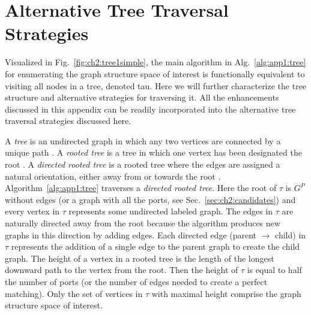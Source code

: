 \section{Alternative Tree Traversal Strategies\label{sec:app1:tree}}

Visualized in Fig.~\ref{fig:ch2:tree1simple}, the main algorithm in Alg.~\ref{alg:app1:tree} for enumerating the graph structure space of interest is functionally equivalent to visiting all nodes in a tree, denoted \gls{tau}.
Here we will further characterize the tree structure and alternative strategies for traversing it.
All the enhancements discussed in this appendix can be readily  incorporated into the alternative tree traversal strategies discussed here.

A \textit{tree} is an undirected graph in which any two vertices are connected by a unique path \cite[p.~27]{Lawler1976a}.
A \textit{rooted tree} is a tree in which one vertex has been designated the root \cite[p.~13]{Diestel2000a}.
A \textit{directed rooted tree} is a rooted tree where the edges are assigned a natural orientation, either away from or towards the root \cite[p.~29]{Lawler1976a}.
Algorithm~\ref{alg:app1:tree} traverses a \textit{directed rooted tree}.
Here the root of $\tau$ is $G^P$ without edges (or a graph with all the ports, see Sec.~\ref{sec:ch2:candidates}) and every vertex in $\tau$ represents some undirected labeled graph.
The edges in $\tau$ are naturally directed away from the root because the algorithm produces new graphs in this direction by adding edges.
Each directed edge (parent $\to$ child) in $\tau$ represents the addition of a single edge to the parent graph to create the child graph. 
The height of a vertex in a rooted tree is the length of the longest downward path to the vertex from the root. %
Then the height of $\tau$ is equal to half the number of ports (or the number of edges needed to create a perfect matching).
Only the set of vertices in $\tau$ with maximal height comprise the graph structure space of interest.

